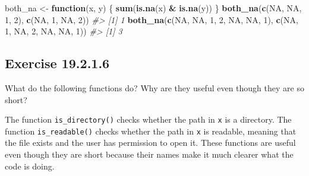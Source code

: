 \documentclass[]{book}
\newenvironment{Shaded}{\begin{snugshade}}{\end{snugshade}}
\newcommand{\CommentTok}[1]{\textcolor[rgb]{0.56,0.35,0.01}{\textit{#1}}}
\newcommand{\ControlFlowTok}[1]{\textcolor[rgb]{0.13,0.29,0.53}{\textbf{#1}}}
\newcommand{\DecValTok}[1]{\textcolor[rgb]{0.00,0.00,0.81}{#1}}
\newcommand{\KeywordTok}[1]{\textcolor[rgb]{0.13,0.29,0.53}{\textbf{#1}}}
\newcommand{\NormalTok}[1]{#1}
\newcommand{\OperatorTok}[1]{\textcolor[rgb]{0.81,0.36,0.00}{\textbf{#1}}}
\newcommand{\OtherTok}[1]{\textcolor[rgb]{0.56,0.35,0.01}{#1}}
\newcommand{\StringTok}[1]{\textcolor[rgb]{0.31,0.60,0.02}{#1}}
\theoremstyle{plain}
\theoremstyle{remark}
\begin{document}
\begin{Shaded}
\begin{Highlighting}[]
\NormalTok{both_na <-}\StringTok{ }\ControlFlowTok{function}\NormalTok{(x, y) \{}
  \KeywordTok{sum}\NormalTok{(}\KeywordTok{is.na}\NormalTok{(x) }\OperatorTok{&}\StringTok{ }\KeywordTok{is.na}\NormalTok{(y))}
\NormalTok{\}}
\KeywordTok{both_na}\NormalTok{(}\KeywordTok{c}\NormalTok{(}\OtherTok{NA}\NormalTok{, }\OtherTok{NA}\NormalTok{,  }\DecValTok{1}\NormalTok{, }\DecValTok{2}\NormalTok{),}
        \KeywordTok{c}\NormalTok{(}\OtherTok{NA}\NormalTok{,  }\DecValTok{1}\NormalTok{, }\OtherTok{NA}\NormalTok{, }\DecValTok{2}\NormalTok{))}
\CommentTok{#> [1] 1}
\KeywordTok{both_na}\NormalTok{(}\KeywordTok{c}\NormalTok{(}\OtherTok{NA}\NormalTok{, }\OtherTok{NA}\NormalTok{,  }\DecValTok{1}\NormalTok{, }\DecValTok{2}\NormalTok{, }\OtherTok{NA}\NormalTok{, }\OtherTok{NA}\NormalTok{, }\DecValTok{1}\NormalTok{),}
        \KeywordTok{c}\NormalTok{(}\OtherTok{NA}\NormalTok{,  }\DecValTok{1}\NormalTok{, }\OtherTok{NA}\NormalTok{, }\DecValTok{2}\NormalTok{, }\OtherTok{NA}\NormalTok{, }\OtherTok{NA}\NormalTok{, }\DecValTok{1}\NormalTok{))}
\CommentTok{#> [1] 3}
\end{Highlighting}
\end{Shaded}

\hypertarget{exercise-19.2.1.6}{%
\subsection*{\texorpdfstring{Exercise
{19.2.1.6}}{Exercise 19.2.1.6}}\label{exercise-19.2.1.6}}

What do the following functions do? Why are they useful even though they
are so short?

\begin{Shaded}
\end{Shaded}

The function \texttt{is\_directory()} checks whether the path in
\texttt{x} is a directory. The function \texttt{is\_readable()} checks
whether the path in \texttt{x} is readable, meaning that the file exists
and the user has permission to open it. These functions are useful even
though they are short because their names make it much clearer what the
code is doing.
\end{document}
